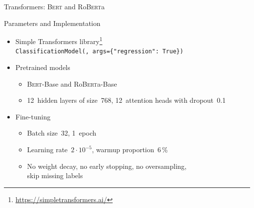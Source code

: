 \documentclass[english,handout]{mlutalk}
\newcommand{\Bert}{\textsc{Bert}\xspace}
\newcommand{\BertBase}{\Bert-Base\xspace}
\newcommand{\Roberta}{\mbox{Ro\textsc{Bert}a}\xspace}
\newcommand{\RobertaBase}{\Roberta-Base\xspace}
\begin{document}
\begin{frame}[allowframebreaks]{Transformers: \Bert and \Roberta}
  \begin{block}{Parameters and Implementation}
    \begin{itemize}
      \item Simple Transformers library\footnote{\url{https://simpletransformers.ai/}} \\ {\smaller\texttt{ClassificationModel(\textellipsis,~args=\{"regression":~True\})}}
      \item Pretrained models
      \begin{itemize}
        \item \BertBase and \RobertaBase
        \item 12~hidden layers of size~768, 12~attention heads with dropout~0.1
      \end{itemize}
      \item Fine-tuning
      \begin{itemize}
        \item Batch size~32, 1~epoch
        \item Learning rate~\(2 \cdot 10^{-5}\), warmup proportion~6\,\%
        \item No weight decay, no early stopping, no oversampling, \\ skip missing labels
      \end{itemize}
    \end{itemize}
  \end{block}
\end{frame}
\end{document}
